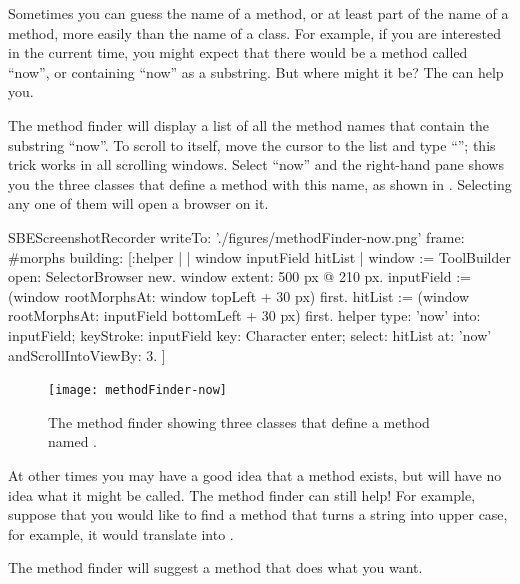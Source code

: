 \documentclass[a4paper,10pt,twoside]{book}
\begin{document}
Sometimes you can guess the name of a method, or at least part of the name of a method, more easily than the name of a class.
For example, if you are interested in the current time, you might expect that there would be a method called ``now'', or containing ``now'' as a substring.
But where might it be?
The  can help you.

The method finder will display a list of all the method names that contain the substring ``now''.
To scroll to  itself, move the cursor to the list and type ``''; this trick works in all scrolling windows.
Select ``now'' and the right-hand pane shows you the three classes that define a method with this name, as shown in .  Selecting any one of them will open a browser on it.

\begin{ExecuteSmalltalkScript}
SBEScreenshotRecorder writeTo: './figures/methodFinder-now.png' frame: #morphs building: [:helper |
	| window inputField hitList |
	window := ToolBuilder open: SelectorBrowser new.
	window extent: 500 px @ 210 px.
	inputField := (window rootMorphsAt: window topLeft + 30 px) first.
	hitList := (window rootMorphsAt: inputField bottomLeft + 30 px) first.
	helper
		type: 'now' into: inputField;
		keyStroke: inputField key: Character enter;
		select: hitList at: 'now' andScrollIntoViewBy: 3.
]
\end{ExecuteSmalltalkScript}

\begin{figure}[hbt]
\centerline {\texttt{[image: methodFinder-now]}}
\caption{The method finder showing three classes that define a method named .
\label{fig:MethodFinder}}
\end{figure}

At other times you may have a good idea that a method exists, but will have no idea what it might be called.
The method finder can still help!
For example, suppose that you would like to find a method that turns a string into upper case, for example, it would translate  into .

\noindent
The method finder will suggest a method that does what you want.
\end{document}
